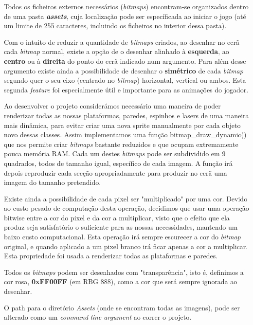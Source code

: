 \documentclass{report}
\begin{document}
Todos os ficheiros externos necessários (\textit{bitmaps}) encontram-se organizados dentro de uma pasta \textbf{\textit{assets}}, cuja localização pode ser específicada ao iniciar o jogo (até um limite de 255 caracteres, incluindo os ficheiros no interior dessa pasta).

Com o intuito de reduzir a quantidade de \textit{bitmaps} criados, ao desenhar no ecrã cada \textit{bitmap} normal, existe a opção de o desenhar alinhado à \textbf{esquerda}, ao \textbf{centro} ou à \textbf{direita} do ponto do ecrã indicado num argumento. Para além desse argumento existe ainda a possibilidade de desenhar o \textbf{simétrico} de cada \textit{bitmap} segundo quer o seu eixo (centrado no \textit{bitmap}) horizontal, vertical ou ambos. Esta segunda \textit{feature} foi especialmente útil e importante para as animações do jogador. 

Ao desenvolver o projeto considerámos necessário uma maneira de poder renderizar todas as nossas plataformas, paredes, espinhos e lasers de uma maneira mais dinâmica, para evitar criar uma nova sprite manualmente por cada objeto novo dessas classes. Assim implementamos uma função bitmap\_draw\_dynamic() que nos permite criar \textit{bitmaps} bastante reduzidos e que ocupam extremamente pouca memória RAM. Cada um destes \textit{bitmaps} pode ser subdividido em 9 quadrados, todos de tamanho igual, específico de cada imagem. A função irá depois reproduzir cada secção apropriadamente para produzir no ecrã uma imagem do tamanho pretendido.

Existe ainda a possibilidade de cada pixel ser "multiplicado" por uma cor. Devido ao custo pesado de computação desta operação, decidimos que usar uma operação bitwise entre a cor do pixel e da cor a multiplicar, visto que o efeito que ela produz seja satisfatório o suficiente para as nossas necessidades, mantendo um baixo custo computacional. Esta operação irá sempre escurecer a cor do \textit{bitmap} original, e quando aplicado a um pixel branco irá ficar apenas a cor a multiplicar. Esta propriedade foi usada a renderizar todas as plataformas e paredes. 

Todos os \textit{bitmaps} podem ser desenhados com "transparência", isto é, definimos a cor rosa, \textbf{0xFF00FF} (em RBG 888), como a cor que será sempre ignorada ao desenhar.

O path para o diretório \textit{Assets} (onde se encontram todas as imagens), pode ser alterado como um \textit{command line argument} ao correr o projeto.
\end{document}
